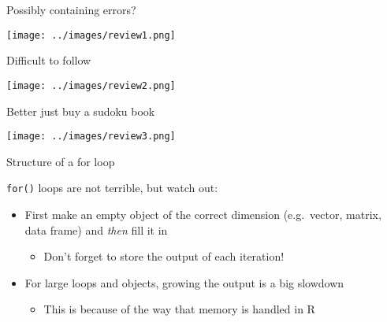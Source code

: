 \documentclass[ignorenonframetext,]{beamer}
\providecommand{\tightlist}{%
  \setlength{\itemsep}{0pt}\setlength{\parskip}{0pt}}
\begin{document}
\begin{frame}{Possibly containing errors?}
\protect\hypertarget{possibly-containing-errors}{}

\texttt{[image: ../images/review1.png]}

\end{frame}

\begin{frame}{Difficult to follow}
\protect\hypertarget{difficult-to-follow}{}

\texttt{[image: ../images/review2.png]}

\end{frame}

\begin{frame}{Better just buy a sudoku book}
\protect\hypertarget{better-just-buy-a-sudoku-book}{}

\texttt{[image: ../images/review3.png]}

\end{frame}

\begin{frame}[fragile]{Structure of a for loop}
\protect\hypertarget{structure-of-a-for-loop}{}

\texttt{for()} loops are not terrible, but watch out:

\begin{itemize}
\tightlist
\item
  First make an empty object of the correct dimension (e.g.~vector,
  matrix, data frame) and \emph{then} fill it in

  \begin{itemize}
  \tightlist
  \item
    Don't forget to store the output of each iteration!
  \end{itemize}
\item
  For large loops and objects, growing the output is a big slowdown

  \begin{itemize}
  \tightlist
  \item
    This is because of the way that memory is handled in R
  \end{itemize}
\end{itemize}

\end{frame}
\end{document}
